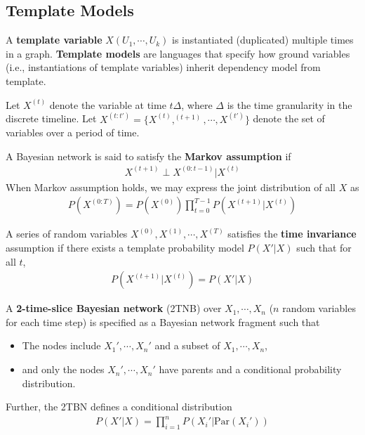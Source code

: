 \documentclass[11pt]{article}
\newcommand{\pa}[0]{\text{Par}}
\begin{document}
	\subsection{Template Models}
	\begin{definition}
		A \textbf{template variable} $X(U_1, \cdots, U_k)$ is instantiated (duplicated) multiple times in a graph.
		\textbf{Template models} are languages that specify how ground variables (i.e., instantiations of template variables) inherit dependency model from template.
	\end{definition}
	
	\begin{notation}
		Let $X^{(t)}$ denote the variable at time $t \Delta$, where $\Delta$ is the time granularity in the discrete timeline.
		Let $X^{(t:t')} = \{X^{(t)}, ^{(t+1)}, \cdots, X^{(t')}\}$ denote the set of variables over a period of time.
	\end{notation}
	
	\begin{definition}
		A Bayesian network is said to satisfy the \textbf{Markov assumption} if
		\begin{align}
			X^{(t+1)} \perp X^{(0:t-1)} | X^{(t)}
		\end{align}
		When Markov assumption holds, we may express the joint distribution of all $X$ as
		\begin{align}
			P(X^{(0:T)}) = P(X^{(0)}) \prod_{t=0}^{T-1} P(X^{(t+1)}|X^{(t)})
		\end{align}
	\end{definition}
	
	\begin{definition}
		A series of random variables $X^{(0)}, X^{(1)}, \cdots, X^{(T)}$ satisfies the \textbf{time invariance} assumption if there exists a template probability model $P(X'|X)$ such that for all $t$,
		\begin{align}
			P(X^{(t+1)}|X^{(t)}) = P(X'|X)
		\end{align}
	\end{definition}
	
	\begin{definition}
		A \textbf{2-time-slice Bayesian network} (2TNB) over $X_1, \cdots, X_n$ ($n$ random variables for each time step) is specified as a Bayesian network fragment such that
		\begin{itemize}
			\item The nodes include $X_1', \cdots, X_n'$ and a subset of $X_1, \cdots, X_n$,
			\item and only the nodes $X_n', \cdots, X_n'$ have parents and a conditional probability distribution.
		\end{itemize}
		Further, the 2TBN defines a conditional distribution
		\begin{align}
			P(X'|X) = \prod_{i=1}^n P(X_i' | \pa(X_i'))
		\end{align}
	\end{definition}
	
\end{document}
